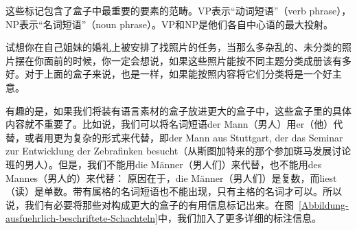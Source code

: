 这些标记包含了盒子中最重要的要素的范畴。VP表示“动词短语”（verb phrase），NP表示“名词短语”（noun phrase）。VP和NP是他们各自中心语的最大投射。

试想你在自己姐妹的婚礼上被安排了找照片的任务，当那么多杂乱的、未分类的照片摆在你面前的时候，你一定会想说，如果这些照片能按不同主题分类成册该有多好。对于上面的盒子来说，也是一样，如果能按照内容将它们分类将是一个好主意。

有趣的是，如果我们将装有语言素材的盒子放进更大的盒子中，这些盒子里的具体内容就不重要了。比如说，我们可以将名词短语der Mann（男人）用er（他）代替，或者用更为复杂的形式来代替，即der Mann aus Stuttgart, der das Seminar zur Entwicklung der Zebrafinken besucht（从斯图加特来的那个参加斑马发展讨论班的男人）。但是，我们不能用die Männer（男人们）来代替，也不能用des Mannes（男人的）来代替：
\eal 
{} 
\zl 
原因在于，die Männer（男人们）是复数，而liest（读）是单数。带有属格的名词短语也不能出现，只有主格的名词才可以。所以说，我们有必要将那些对构成更大的盒子的有用信息标记出来。在图~\vref{Abbildung-ausfuehrlich-beschriftete-Schachteln}中，我们加入了更多详细的标注信息。

